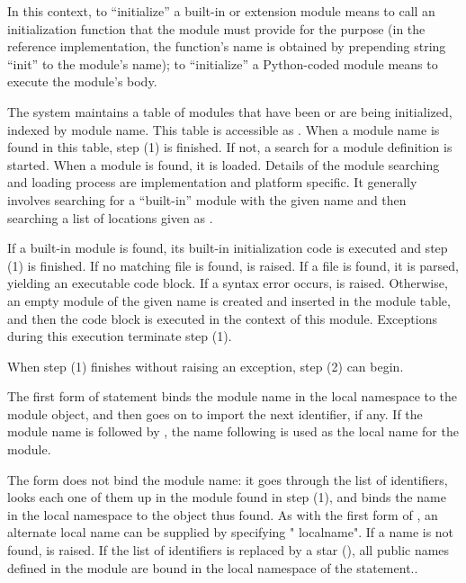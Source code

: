 In this context, to ``initialize'' a built-in or extension module means to
call an initialization function that the module must provide for the purpose
(in the reference implementation, the function's name is obtained by
prepending string ``init'' to the module's name); to ``initialize'' a
Python-coded module means to execute the module's body.
  
The system maintains a table of modules that have been or are being
initialized,
indexed by module name.  This table is
accessible as .  When a module name is found in
this table, step (1) is finished.  If not, a search for a module
definition is started.  When a module is found, it is loaded.  Details
of the module searching and loading process are implementation and
platform specific.  It generally involves searching for a ``built-in''
module with the given name and then searching a list of locations
given as .

If a built-in module is found, its
built-in initialization code is executed and step (1) is finished.  If
no matching file is found,
 is raised.
If a file is found, it is parsed,
yielding an executable code block.  If a syntax error occurs,
 is raised.  Otherwise, an
empty module of the given name is created and inserted in the module
table, and then the code block is executed in the context of this
module.  Exceptions during this execution terminate step (1).

When step (1) finishes without raising an exception, step (2) can
begin.

The first form of  statement binds the module name in
the local namespace to the module object, and then goes on to import
the next identifier, if any.  If the module name is followed by
, the name following  is used as the local
name for the module. 

The  form does not bind the module name: it goes through the
list of identifiers, looks each one of them up in the module found in step
(1), and binds the name in the local namespace to the object thus found. 
As with the first form of , an alternate local name can be
supplied by specifying " localname".  If a name is not found,
 is raised.  If the list of identifiers is replaced
by a star (\character{*}), all public names defined in the module are
bound in the local namespace of the  statement..

